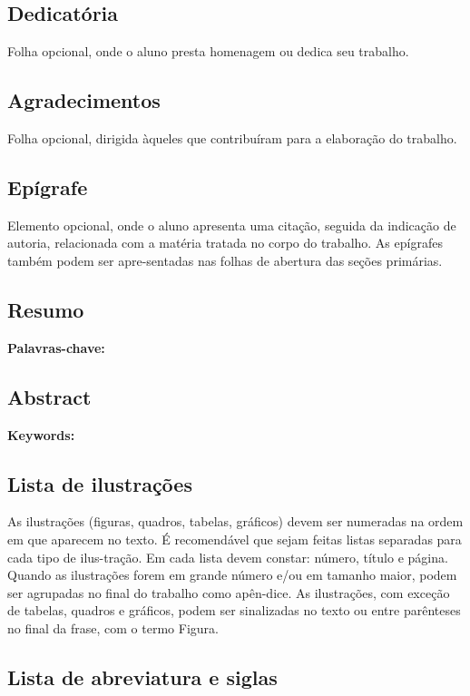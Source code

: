 \subsection{Dedicatória}

Folha opcional, onde o aluno presta homenagem ou dedica seu trabalho.

\subsection{Agradecimentos}

Folha opcional, dirigida àqueles que contribuíram para a
elaboração do trabalho.

\subsection{Epígrafe}

Elemento opcional, onde o aluno apresenta uma citação, seguida da
indicação de autoria, relacionada com a matéria tratada no corpo do trabalho. As epígrafes também podem ser apre-sentadas nas folhas de abertura das seções primárias.

\subsection{Resumo}

\textbf{Palavras-chave:} 
\subsection{Abstract}

\textbf{Keywords:} 

\subsection{Lista de ilustrações}

As ilustrações (figuras, quadros, tabelas, gráficos) devem ser
numeradas na ordem em que aparecem no texto. É recomendável que sejam feitas listas separadas para cada tipo de ilus-tração. Em cada lista devem constar: número, título e página. Quando as ilustrações forem em grande número e/ou em tamanho maior, podem ser agrupadas no final do trabalho como apên-dice. As ilustrações, com exceção de tabelas, quadros e gráficos, podem ser sinalizadas no texto ou entre parênteses no final da frase, com o termo Figura.

\subsection{Lista de abreviatura e siglas}


